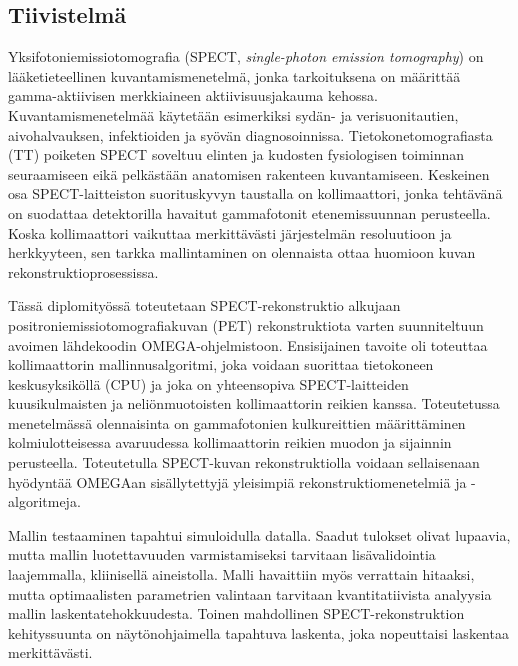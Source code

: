 \begin{titlepage}
    \section*{Tiivistelmä}
    Yksifotoniemissiotomografia (SPECT, \textit{single-photon emission tomography}) on lääketieteellinen kuvantamismenetelmä, jonka tarkoituksena on määrittää gamma-aktiivisen merkkiaineen aktiivisuusjakauma kehossa. Kuvantamismenetelmää käytetään esimerkiksi sydän- ja verisuonitautien, aivohalvauksen, infektioiden ja syövän diagnosoinnissa. Tietokonetomografiasta (TT) poiketen SPECT soveltuu elinten ja kudosten fysiologisen toiminnan seuraamiseen eikä pelkästään anatomisen rakenteen kuvantamiseen. Keskeinen osa SPECT-laitteiston suorituskyvyn taustalla on kollimaattori, jonka tehtävänä on suodattaa detektorilla havaitut gammafotonit etenemissuunnan perusteella. Koska kollimaattori vaikuttaa merkittävästi järjestelmän resoluutioon ja herkkyyteen, sen tarkka mallintaminen on olennaista ottaa huomioon kuvan rekonstruktioprosessissa.

    Tässä diplomityössä toteutetaan SPECT-rekonstruktio alkujaan positroniemissiotomografiakuvan (PET) rekonstruktiota varten suunniteltuun avoimen lähdekoodin OMEGA-ohjelmistoon. Ensisijainen tavoite oli toteuttaa kollimaattorin mallinnusalgoritmi, joka voidaan suorittaa tietokoneen keskusyksiköllä (CPU) ja joka on yhteensopiva SPECT-laitteiden kuusikulmaisten ja neliönmuotoisten kollimaattorin reikien kanssa. Toteutetussa menetelmässä olennaisinta on gammafotonien kulkureittien määrittäminen kolmiulotteisessa avaruudessa kollimaattorin reikien muodon ja sijainnin perusteella. Toteutetulla SPECT-kuvan rekonstruktiolla voidaan sellaisenaan hyödyntää OMEGAan sisällytettyjä yleisimpiä rekonstruktiomenetelmiä ja -algoritmeja.

    Mallin testaaminen tapahtui simuloidulla datalla. Saadut tulokset olivat lupaavia, mutta mallin luotettavuuden varmistamiseksi tarvitaan lisävalidointia laajemmalla, kliinisellä aineistolla. Malli havaittiin myös verrattain hitaaksi, mutta optimaalisten parametrien valintaan tarvitaan kvantitatiivista analyysia mallin laskentatehokkuudesta. Toinen mahdollinen SPECT-rekonstruktion kehityssuunta on näytönohjaimella tapahtuva laskenta, joka nopeuttaisi laskentaa merkittävästi.
\end{titlepage}